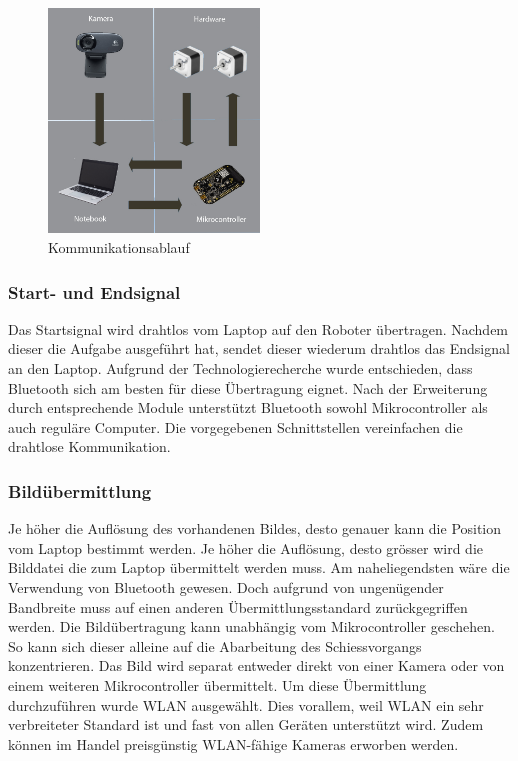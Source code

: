 \begin{figure}[h!]          
	\centering             
	\includegraphics[width=0.5\textwidth]{fig/kommunikationsablauf.jpg}    
	\caption{Kommunikationsablauf}
	
	\label{fig:Kommunikationsablauf}
\end{figure}
\noindent
\subsubsection{Start- und Endsignal}
Das Startsignal wird drahtlos vom Laptop auf den Roboter übertragen. Nachdem dieser die Aufgabe ausgeführt hat, sendet dieser wiederum drahtlos das Endsignal an den Laptop. Aufgrund der Technologierecherche wurde entschieden, dass Bluetooth sich am besten für diese Übertragung eignet. Nach der Erweiterung durch entsprechende Module unterstützt Bluetooth sowohl Mikrocontroller als auch reguläre Computer. Die vorgegebenen Schnittstellen vereinfachen die drahtlose Kommunikation.
\subsubsection{Bildübermittlung}
Je höher die Auflösung des vorhandenen Bildes, desto genauer kann die Position vom Laptop bestimmt werden. Je höher die Auflösung, desto grösser wird die Bilddatei die zum Laptop übermittelt werden muss. Am naheliegendsten wäre die Verwendung von Bluetooth gewesen. Doch aufgrund von ungenügender Bandbreite muss auf einen anderen Übermittlungsstandard zurückgegriffen werden. Die Bildübertragung kann unabhängig vom Mikrocontroller geschehen. So kann sich dieser alleine auf die Abarbeitung des Schiessvorgangs konzentrieren. Das Bild wird separat entweder direkt von einer Kamera oder von einem weiteren Mikrocontroller übermittelt. Um diese Übermittlung durchzuführen wurde WLAN ausgewählt. Dies vorallem, weil WLAN ein sehr verbreiteter Standard ist und fast von allen Geräten unterstützt wird. Zudem können im Handel preisgünstig WLAN-fähige Kameras erworben werden.

